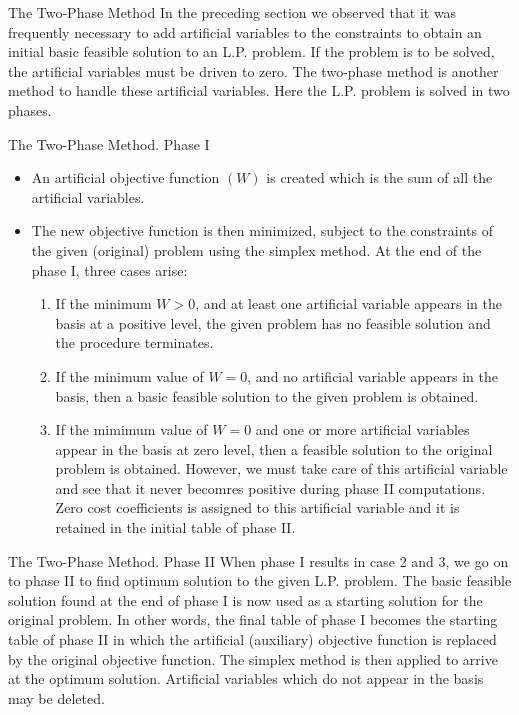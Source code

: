 \begin{frame}{The Two-Phase Method}
  In the preceding  section we observed that it was frequently necessary to add artificial variables to the constraints to obtain an initial basic feasible solution to an L.P. problem. If the problem is to be solved, \alert{the artificial variables must be driven to zero}. The two-phase method is another method to handle these artificial variables. Here \alert{the L.P. problem is solved in two phases}.  
\end{frame}


\begin{frame}{The Two-Phase Method. Phase I}
  \begin{itemize} \justifying \parskip3mm
  \item<only@1> An artificial objective function $(W)$ is created which is \alert{the sum of all the artificial variables}.
  \item<only@1,2> \alert{The new objective function is then minimized}, subject to the \alert{constraints of the given (original) problem} using the simplex method. At the end of the phase I, three cases arise:
    \begin{enumerate} \justifying
    \item<only@2> If the \alert{minimum $W > 0$}, and at least one artificial variable appears in the basis at a positive level,  \alert{the given problem has no feasible solution} and the procedure terminates.
    \item<only@2> If the minimum value of \alert{$W = 0$, and no artificial variable appears in the basis}, then \alert{a basic feasible solution to the given problem is obtained}.
    \item<only@2> \alert{If the mimimum value of $W = 0$ and one or more artificial variables appear in the basis at zero level}, then a feasible solution to the original problem is obtained. However, \alert{we must take care of this artificial variable and see that it never becomres positive during phase II computations}. Zero cost coefficients is assigned to this artificial variable and it is retained in the initial table of phase II.
    \end{enumerate}
  \end{itemize}
\end{frame}


\begin{frame}{The Two-Phase Method. Phase II}
  When phase I results in case 2 and 3, we go on to phase II to find optimum solution to the given L.P. problem. The basic feasible solution found at the end of phase I is now used as a starting solution for the original problem. In other words, \alert{the final table of phase I becomes the starting table of phase II in which the artificial (auxiliary) objective function is replaced by the original objective function. The simplex method is then applied to arrive at the optimum solution}. Artificial variables which do not appear in the basis may be deleted.
\end{frame}



